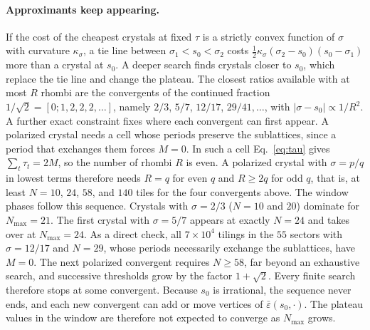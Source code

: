 \documentclass[aps,prb,twocolumn,superscriptaddress,floatfix]{revtex4-2}
\newcommand{\eps}{\varepsilon}
\begin{document}
\paragraph*{Approximants keep appearing.} If the cost of the cheapest crystals at fixed $\tau$ is a strictly convex function of $\sigma$ with curvature $\kappa_\sigma$, a tie line between $\sigma_1<s_0<\sigma_2$ costs $\tfrac12\kappa_\sigma(\sigma_2-s_0)(s_0-\sigma_1)$ more than a crystal at $s_0$. A deeper search finds crystals closer to $s_0$, which replace the tie line and change the plateau. The closest ratios available with at most $R$ rhombi are the convergents of the continued fraction $1/\sqrt2=[0;1,2,2,2,\dots]$, namely $2/3$, $5/7$, $12/17$, $29/41,\dots$, with $|\sigma-s_0|\propto1/R^2$. A further exact constraint fixes where each convergent can first appear. A polarized crystal needs a cell whose periods preserve the sublattices, since a period that exchanges them forces $M=0$. In such a cell Eq.~\eqref{eq:tau} gives $\sum_t\tau_t=2M$, so the number of rhombi $R$ is even. A polarized crystal with $\sigma=p/q$ in lowest terms therefore needs $R=q$ for even $q$ and $R\ge2q$ for odd $q$, that is, at least $N=10$, $24$, $58$, and $140$ tiles for the four convergents above. The window phases follow this sequence. Crystals with $\sigma=2/3$ ($N=10$ and $20$) dominate for $N_{\max}=21$. The first crystal with $\sigma=5/7$ appears at exactly $N=24$ and takes over at $N_{\max}=24$. As a direct check, all $7\times10^4$ tilings in the $55$ sectors with $\sigma=12/17$ and $N=29$, whose periods necessarily exchange the sublattices, have $M=0$. The next polarized convergent requires $N\ge58$, far beyond an exhaustive search, and successive thresholds grow by the factor $1+\sqrt2$. Every finite search therefore stops at some convergent. Because $s_0$ is irrational, the sequence never ends, and each new convergent can add or move vertices of $\bar\eps(s_0,\cdot)$. The plateau values in the window are therefore not expected to converge as $N_{\max}$ grows.
\end{document}
